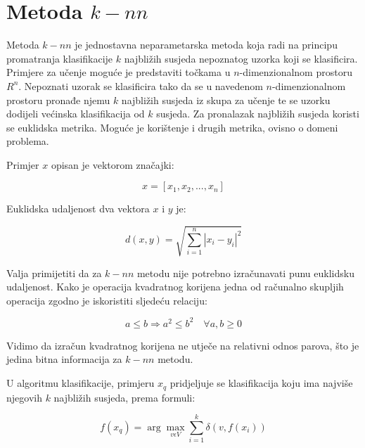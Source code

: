 \documentclass{ru}
\begin{document}
\section{Metoda $k-nn$}


Metoda $k-nn$ je jednostavna neparametarska metoda koja radi na principu
promatranja klasifikacije $k$ najbližih susjeda nepoznatog uzorka koji se
klasificira. Primjere za učenje moguće je predstaviti točkama u
$n$-dimenzionalnom prostoru $R^{n}$. Nepoznati uzorak se klasificira tako da
se u navedenom $n$-dimenzionalnom prostoru pronađe njemu $k$ najbližih susjeda
iz skupa za učenje te se uzorku dodijeli većinska klasifikacija od $k$ susjeda.
Za pronalazak najbližih susjeda koristi se euklidska metrika. Moguće je
korištenje i drugih metrika, ovisno o domeni problema.

Primjer $x$ opisan je vektorom značajki:

\begin{equation}
x = [x_1, x_2, ..., x_n]
\end{equation}

Euklidska udaljenost dva vektora $x$ i $y$ je:

\begin{equation}
d(x, y) = \sqrt{\sum_{i=1}^n |x_i - y_i|^2}
\end{equation}

Valja primijetiti da za $k-nn$ metodu nije potrebno izračunavati punu euklidsku
udaljenost. Kako je operacija kvadratnog korijena jedna od računalno skupljih
operacija zgodno je iskoristiti sljedeću relaciju:

\begin{equation}
a \leq b \Rightarrow a^2 \leq b^2 \quad \forall a,b \geq 0
\end{equation}

Vidimo da izračun kvadratnog korijena ne utječe na relativni odnos parova, što
je jedina bitna informacija za $k-nn$ metodu.

U algoritmu klasifikacije, primjeru $x_q$ pridjeljuje se klasifikacija koju ima najviše njegovih $k$ najbližih
susjeda, prema formuli:

\begin{equation}
f(x_q)=\arg\max_{v \epsilon V} \sum_{i=1}^k \delta(v,f(x_i))
\end{equation}
\end{document}
